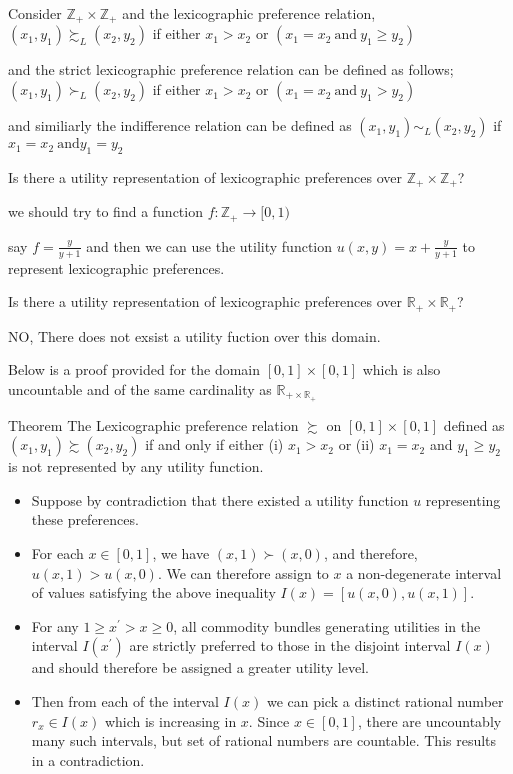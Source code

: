 \documentclass[12pt,a4paper,fleqn]{article}
\begin{document}
Consider \(\mathbb{Z}_{+} \times \mathbb{Z}_{+}\) and the lexicographic preference relation,
\(\left( x_{1},y_{1} \right) \succsim_{L} \left( x_{2},y_{2} \right)  \)   if either \(x_{1}>x_{2}\) or  \(\left( x_{1}=x_{2} \ \text{and} \ y_{1} \geq y_{2} \right) \) 

and the strict lexicographic preference relation can be defined as follows;
\(\left( x_{1},y_{1} \right) \succ_{L} \left( x_{2},y_{2} \right)  \) if either \(x_{1}>x_{2}\) or \(\left( x_{1}=x_{2} \ \text{and} \ y_{1}>y_{2} \right) \)  

and similiarly the indifference relation can be defined as \(\left( x_{1},y_{1} \right) \sim_{L} \left( x_{2},y_{2} \right)  \) if \(x_{1}=x_{2} \ \text{and} y_{1}=y_{2}\)    

Is there a utility representation of lexicographic preferences over \(\mathbb{Z}_{+} \times \mathbb{Z}_{+}\)?   

we should try to find a function \(f: \mathbb{Z}_{+} \to [0,1) \)  

say \(f=\frac{y}{y+1}\) and then we can use the utility function \(u(x,y)=x+\frac{y}{y+1}\) to represent lexicographic preferences.   

Is there a utility representation of lexicographic preferences over \(\mathbb{R}_{+} \times \mathbb{R}_{+}\)? 

NO, There does not exsist a utility fuction over this domain.

Below is a proof provided for the domain \([0,1] \times [0,1]\) which is also uncountable and of the same cardinality as \(\mathbb{R}_{+ \times \mathbb{R}_{+}}\)   

Theorem
  The Lexicographic preference relation \(\succsim \) on \([0,1] \times[0,1]\) defined as \(\left(x_1, y_1\right) \succsim\left(x_2, y_2\right)\) if and only if either (i) \(x_1>x_2\) or (ii) \(x_1=x_2\) and \(y_1 \geq y_2\) is not represented by any utility function.
\begin{itemize}
  \item Suppose by contradiction that there existed a utility function \(u\) representing these preferences.
  \item For each \(x \in[0,1]\), we have \((x, 1) \succ(x, 0)\), and therefore, \(u(x, 1)>u(x, 0)\). We can therefore assign to \(x\) a non-degenerate interval of values satisfying the above inequality \(I(x)=[u(x, 0), u(x, 1)]\).
  \item  For any \(1 \geq x^{\prime}>x \geq 0\), all commodity bundles generating utilities in the interval \(I\left(x^{\prime}\right)\) are strictly preferred to those in the disjoint interval \(I(x)\) and should therefore be assigned a greater utility level.
  \item Then from each of the interval \(I(x)\) we can pick a distinct rational number \(r_x \in I(x)\) which is increasing in \(x\). Since \(x \in[0,1]\), there are uncountably many such intervals, but set of rational numbers are countable. This results in a contradiction.
\end{itemize}
\end{document}
